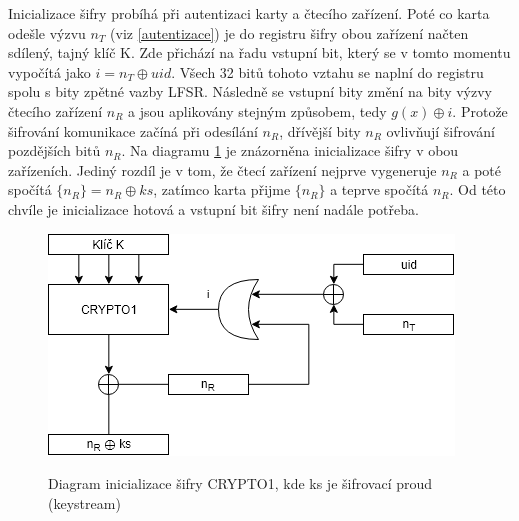 \par
Inicializace šifry probíhá při autentizaci karty a čtecího zařízení. Poté co karta odešle výzvu $n_T$ (viz \ref{autentizace}) je do registru šifry obou zařízení načten sdílený, tajný klíč K. Zde přichází na řadu vstupní bit, který se v tomto momentu vypočítá jako $i = n_T \oplus {uid}$. Všech 32 bitů tohoto vztahu se naplní do registru spolu s bity zpětné vazby LFSR. Následně se vstupní bity změní na bity výzvy čtecího zařízení $n_R$ a jsou aplikovány stejným způsobem, tedy $g(x) \oplus i$. Protože šifrování komunikace začíná při odesílání $n_R$, dřívější bity $n_R$ ovlivňují šifrování pozdějších bitů $n_R$. Na diagramu \ref{obrazekInicializaceSifry} je znázorněna inicializace šifry v obou zařízeních. Jediný rozdíl je v tom, že čtecí zařízení nejprve vygeneruje $n_R$ a poté spočítá ${\{n_R\} = n_R \oplus ks}$, zatímco karta přijme $\{n_R\}$ a teprve spočítá $n_R$. Od této chvíle je inicializace hotová a vstupní bit šifry není nadále potřeba\cite{Dismantling_Mifare_Classic}.

\begin{figure}[ht]\centering
  \centering
  \includegraphics[width=0.7\linewidth]{obrazky-figures/cryptoInitialization.png}\\[1pt]  
  \caption{Diagram inicializace šifry CRYPTO1, kde ks je šifrovací proud (keystream)\cite{Dismantling_Mifare_Classic}}    
  \label{obrazekInicializaceSifry}
\end{figure}

